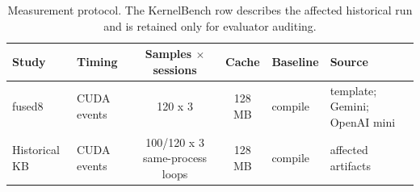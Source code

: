 \begin{table}[htbp]
\centering
\caption{Measurement protocol. The KernelBench row describes the affected historical run and is retained only for evaluator auditing.}
\label{tab:protocol}
\small
\begin{tabularx}{\linewidth}{l l c c l X}
\toprule
Study & Timing & Samples $\times$ sessions & Cache & Baseline & Source \\
\midrule
fused8 & CUDA events & 120 x 3 & 128 MB & compile & template; Gemini; OpenAI mini \\
Historical KB & CUDA events & 100/120 x 3 same-process loops & 128 MB & compile & affected artifacts \\
\bottomrule
\end{tabularx}
\end{table}
